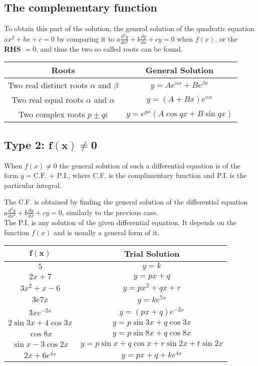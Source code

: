 \documentclass{standalone}
\begin{document}
	\subsection{The complementary function}
	To obtain this part of the solution, the general solution of the quadratic equation $ax^2 + bx + c=0$ by comparing it to $a\frac{d^2y}{dx^2} + b\frac{dy}{dx} + cy = 0$ when $f(x)$, or the \textbf{RHS} $= 0$, and thus the two so called roots can be found. 
	
	\begin{center}
		\renewcommand{\arraystretch}{1.6}
		\begin{tabular}{|c|c|}
			\hline
			Roots                                        & General Solution                 \\ \hline
			Two real distinct roots $\alpha$ and $\beta$ & $y=Ae^{\alpha x} + Be^{\beta x}$ \\ \hline
			Two real equal roots $\alpha$ and $\alpha$   & $y=(A+Bx)e^{\alpha x}$           \\ \hline
			Two complex roots $p\pm qi$                  & $y=e^{px}(A\cos qx + B\sin qx)$  \\\hline
		\end{tabular}
	\end{center}	
	
	\subsection{Type 2: $\mathbf{f(x) \neq 0}$}
	When $f(x) \neq 0$ the general solution of such a differential equation is of the form $y=\text{C.F. + P.I.}$, where C.F. is the complimentary function and P.I. is the particular integral.

	The C.F. is obtained by finding the general solution of the differential equation $a\frac{d^2y}{dx^2} + b\frac{dy}{dx} + cy = 0$, similarly to the previous case.\\

	The P.I. is any solution of the given differential equation. It depends on the function $f(x)$ and is usually a general form of it.
	\begin{center}
		\renewcommand{\arraystretch}{1.6}
		\begin{tabular}{|c|c|}
			\hline
			$\mathbf{f(x)}$		& \textbf{Trial Solution}\\\hline
			$5$					& $y=k$\\\hline
			$2x+7$				& $y=px+q$\\\hline
			$3x^2+x-6$			& $y=px^2+qx+r$\\\hline
			$3e{7x}$			& $y=ke^{7x}$\\\hline
			$3xe^{-2x}$     	& $y=(px+q)e^{-2x}$\\\hline
			$2\sin3x + 4\cos3x$ & $y=p\sin3x + q\cos3x$\\\hline
			$\cos8x$ 			& $y=p\sin8x + q\cos8x$\\\hline
			$\sin x - 3\cos2x$  & $y=p\sin x + q\cos x +r\sin2x + t\sin2x$\\\hline
			$2x + 6e^{4x}$		& $y=px+q+ke^{4x}$\\\hline
		\end{tabular}
	\end{center}
	\newpage
	
\end{document}
